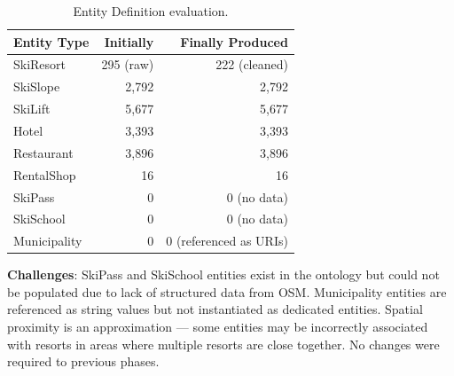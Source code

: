 \begin{table}[h!]
\centering
\begin{tabular}{|l|r|r|}
\hline
\textbf{Entity Type} & \textbf{Initially} & \textbf{Finally Produced} \\
\hline
SkiResort & 295 (raw) & 222 (cleaned) \\
SkiSlope & 2,792 & 2,792 \\
SkiLift & 5,677 & 5,677 \\
Hotel & 3,393 & 3,393 \\
Restaurant & 3,896 & 3,896 \\
RentalShop & 16 & 16 \\
SkiPass & 0 & 0 (no data) \\
SkiSchool & 0 & 0 (no data) \\
Municipality & 0 & 0 (referenced as URIs) \\
\hline
\end{tabular}
\caption{Entity Definition evaluation.}
\end{table}

\noindent \textbf{Challenges}: SkiPass and SkiSchool entities exist in the ontology but could not be populated due to lack of structured data from OSM. Municipality entities are referenced as string values but not instantiated as dedicated entities. Spatial proximity is an approximation --- some entities may be incorrectly associated with resorts in areas where multiple resorts are close together. No changes were required to previous phases.
